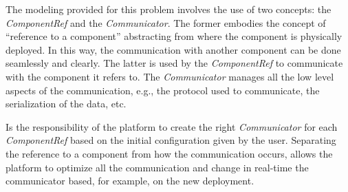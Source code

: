 The modeling provided for this problem involves the use of two concepts: the \emph{ComponentRef} and the \emph{Communicator}.
The former embodies the concept of ``reference to a component'' abstracting from where the component is physically deployed. In this way, the
communication with another component can be done seamlessly and clearly.
The latter is used by the \emph{ComponentRef} to communicate with the component it refers to. The \emph{Communicator} manages all the low level
aspects of the communication, e.g., the protocol used to communicate, the serialization of the data, etc.

Is the responsibility of the platform to create the right \emph{Communicator} for each \emph{ComponentRef} based on the initial configuration given
by the user. Separating the reference to a component from how the communication occurs, allows the platform to optimize all the communication and change in real-time the communicator based, for example, on the new deployment.







